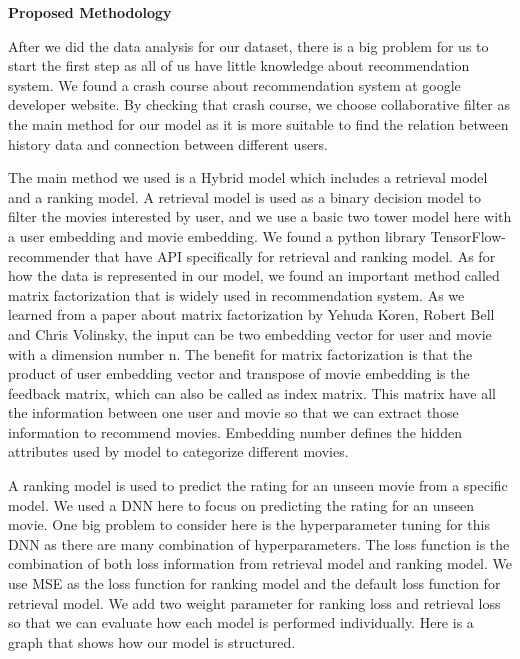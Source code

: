 \documentclass{article}
\begin{document}
\vspace{2.5cm}

    \begin{flushleft}
        \textbf{\LARGE Proposed Methodology}
    \end{flushleft}

After we did the data analysis for our dataset, there is a big problem for us to start the first step as all of us have little knowledge about recommendation system. We found a crash course about recommendation system at google developer website. By checking that crash course, we choose collaborative filter as the main method for our model as it is more suitable to find the relation between history data and connection between different users.

\vspace{0.3cm}

The main method we used is a Hybrid model which includes a retrieval model and a ranking model. A retrieval model is used as a binary decision model to filter the movies interested by user, and we use a basic two tower model here with a user embedding and movie embedding. We found a python library TensorFlow-recommender that have API specifically for retrieval and ranking model. As for how the data is represented in our model, we found an important method called matrix factorization that is widely used in recommendation system. As we learned from a paper about matrix factorization by Yehuda Koren, Robert Bell and Chris Volinsky, the input can be two embedding vector for user and movie with a dimension number n. The benefit for matrix factorization is that the product of user embedding vector and transpose of movie embedding is the feedback matrix, which can also be called as index matrix. This matrix have all the information between one user and movie so that we can extract those information to recommend movies. Embedding number defines the hidden attributes used by model to categorize different movies.

\vspace{0.3cm}

A ranking model is used to predict the rating for an unseen movie from a specific model. We used a DNN here to focus on predicting the rating for an unseen movie. One big problem to consider here is the hyperparameter tuning for this DNN as there are many combination of hyperparameters. The loss function is the combination of both loss information from retrieval model and ranking model. We use MSE as the loss function for ranking model and the default loss function for retrieval model. We add two weight parameter for ranking loss and retrieval loss so that we can evaluate how each model is performed individually. Here is a graph that shows how our model is structured.
\end{document}

